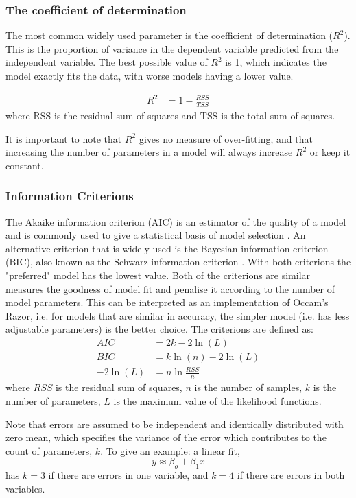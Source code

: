 \documentclass[12pt,a4paper]{article}
\begin{document}
	\subsubsection{The coefficient of determination}
	The most common widely used parameter is the coefficient of determination ($R^2$). This is the proportion of variance in the dependent variable predicted from the independent variable. The best possible value of $R^2$ is 1, which indicates the model exactly fits the data, with worse models having a lower value.
	
	\begin{align}
	R^2 &= 1- \frac{RSS}{TSS}
	\end{align}
	where RSS is the residual sum of squares and TSS is the total sum of squares.
	
	It is important to note that $R^2$ gives no measure of over-fitting, and that increasing the number of parameters in a model will always increase $R^2$ or keep it constant. 
	


	\subsubsection{Information Criterions}
	The Akaike information criterion (AIC) is an estimator of the quality of a model and is commonly used to give a statistical basis of model selection \parencite{Akaike1974}. An alternative criterion that is widely used is the Bayesian  information criterion (BIC), also known as the Schwarz information criterion  \parencite{Schwarz1978}. With both criterions the "preferred" model has the lowest value. Both of the criterions are similar measures the goodness of model fit and penalise it according to the number of model parameters. This can be interpreted as an implementation of Occam's Razor, i.e. for models that are similar in accuracy, the simpler model (i.e. has less adjustable parameters) is the better choice. 	The criterions are defined as:
	\begin{align}
	AIC &= 2k - 2\ln (L)\\
	BIC &= k\ln(n) - 2\ln (L) \\
	-2\ln(L) &=  n\ln \frac{RSS}{n}
	\end{align}
	where $RSS$ is the residual sum of squares, $n$ is the number of samples, $k$ is the number of parameters, $L$ is the maximum value of the likelihood functions. 
	
	Note that errors are assumed to be independent and identically distributed with zero mean, which specifies the variance of the error which contributes to the count of parameters, $k$. To give an example: a linear fit,
	\begin{equation}
		y\approx\beta_o+\beta_1x
	\end{equation}
	has $k=3$ if there are errors in one variable, and $k=4$ if there are errors in both variables.
	
\end{document}
